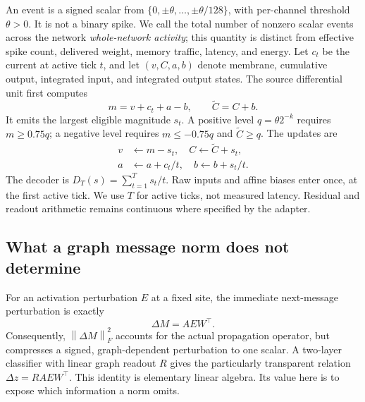 \documentclass[10pt,twocolumn,letterpaper]{article}
\newcommand{\norm}[1]{\left\lVert#1\right\rVert}
\begin{document}
An event is a signed scalar from $\{0,\pm\theta,\ldots,\pm\theta/128\}$, with per-channel threshold $\theta>0$. It is not a binary spike. We call the total number of nonzero scalar events across the network \emph{whole-network activity}; this quantity is distinct from effective spike count, delivered weight, memory traffic, latency, and energy. Let $c_t$ be the current at active tick $t$, and let $(v,C,a,b)$ denote membrane, cumulative output, integrated input, and integrated output states. The source differential unit first computes
\begin{equation}
 m=v+c_t+a-b,\qquad \widetilde C=C+b.
\end{equation}
It emits the largest eligible magnitude $s_t$. A positive level $q=\theta2^{-k}$ requires $m\geq0.75q$; a negative level requires $m\leq-0.75q$ and $\widetilde C\geq q$. The updates are
\begin{equation}
\begin{split}
 v&\leftarrow m-s_t,\quad C\leftarrow\widetilde C+s_t,\\
 a&\leftarrow a+c_t/t,\quad b\leftarrow b+s_t/t.
\end{split}\label{eq:state}
\end{equation}
The decoder is $D_T(s)=\sum_{t=1}^T s_t/t$. Raw inputs and affine biases enter once, at the first active tick. We use $T$ for active ticks, not measured latency. Residual and readout arithmetic remains continuous where specified by the adapter.

\subsection{What a graph message norm does not determine}
For an activation perturbation $E$ at a fixed site, the immediate next-message perturbation is exactly
\begin{equation}
 \Delta M=AEW^\top.\label{eq:message}
\end{equation}
Consequently, $\norm{\Delta M}_F^2$ accounts for the actual propagation operator, but compresses a signed, graph-dependent perturbation to one scalar. A two-layer classifier with linear graph readout $R$ gives the particularly transparent relation $\Delta z=RAEW^\top$. This identity is elementary linear algebra. Its value here is to expose which information a norm omits.
\end{document}
